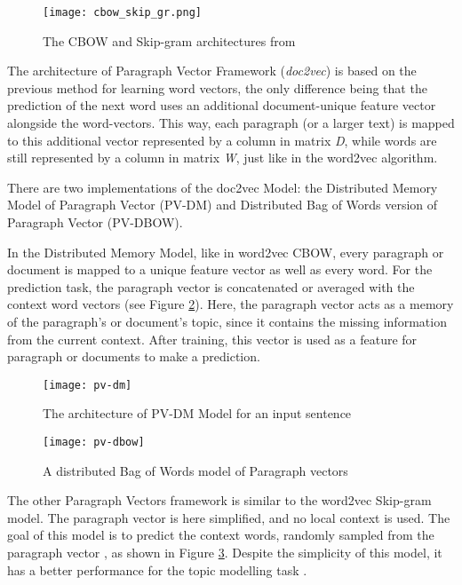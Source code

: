\documentclass[fontsize=12pt,a4paper,twoside,openany]{scrbook}
\begin{document}
\begin{figure}[h]
\centering
\texttt{[image: cbow\_skip\_gr.png]}
\caption{The CBOW and Skip-gram architectures from \parencite{TMikolov13}}
\label{fig:cbow_skip_gr}
\end{figure}

The architecture of Paragraph Vector Framework (\emph{doc2vec}) is based on the previous method for learning word vectors, the only difference being that the prediction of the next word uses an additional document-unique feature vector alongside the word-vectors. This way, each paragraph (or a larger text) is mapped to this additional vector represented by a column in matrix \emph{D}, while words are still represented by a column in matrix \emph{W}, just like in the word2vec algorithm. 

There are two implementations of the doc2vec Model: the Distributed Memory Model of Paragraph Vector (PV-DM) and Distributed Bag of Words version of Paragraph Vector (PV-DBOW).

In the Distributed Memory Model, like in word2vec CBOW, every paragraph or document is mapped to a unique feature vector as well as every word. For the prediction task, the paragraph vector is concatenated or averaged with the context word vectors (see Figure \ref{fig:pv-dm}). Here, the paragraph vector acts as a memory of the paragraph's or document's topic, since it contains the missing information from the current context. After training, this vector is used as a feature for paragraph or documents to make a prediction.

\begin{figure}[!ht]
\centering
\texttt{[image: pv-dm]}
\caption{The architecture of PV-DM Model for an input sentence}
\label{fig:pv-dm}
\end{figure}

\begin{figure}[!ht]
\centering
\texttt{[image: pv-dbow]}
\caption{A distributed Bag of Words model of Paragraph vectors}
\label{fig:pv-dbow}
\end{figure}

The other Paragraph Vectors framework is similar to the word2vec Skip-gram model. The paragraph vector is here simplified, and no local context is used. The goal of this model is to predict the context words, randomly sampled from the paragraph vector \parencite{Le14}, as shown in Figure \ref{fig:pv-dbow}. Despite the simplicity of this model, it has a better performance for the topic modelling task \parencite{Angelov20}.
\end{document}
